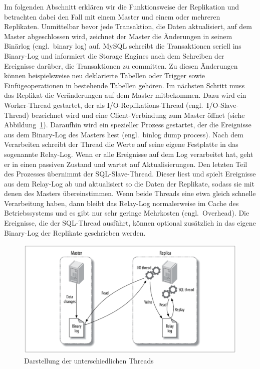 Im folgenden Abschnitt erklären wir die Funktionsweise der Replikation und betrachten dabei den Fall mit einem Master und einem oder mehreren Replikaten.
Unmittelbar bevor jede Transaktion, die Daten aktualisiert, auf dem Master abgeschlossen wird, zeichnet der Master die Änderungen in seinem Binärlog (engl.\ binary log) auf.
MySQL schreibt die Transaktionen seriell ins Binary-Log und informiert die Storage Engines nach dem Schreiben der Ereignisse darüber, die Transaktionen zu committen.
Zu diesen Änderungen können beispielsweise neu deklarierte Tabellen oder Trigger sowie Einfügeoperationen in bestehende Tabellen gehören.
Im nächsten Schritt muss das Replikat die Veränderungen auf dem Master mitbekommen.
Dazu wird ein Worker-Thread gestartet, der als I/O-Replikations-Thread (engl.\ I/O-Slave-Thread) bezeichnet wird und eine Client-Verbindung zum Master öffnet (siehe Abbildung~\ref{fig:master-replica}).
Daraufhin wird ein spezieller Prozess gestartet, der die Ereignisse aus dem Binary-Log des Masters liest (engl.\ binlog dump process).
Nach dem Verarbeiten schreibt der Thread die Werte auf seine eigene Festplatte in das sogenannte Relay-Log.
Wenn er alle Ereignisse auf dem Log verarbeitet hat, geht er in einen passiven Zustand und wartet auf Aktualisierungen.
Den letzten Teil des Prozesses übernimmt der SQL-Slave-Thread.
Dieser liest und spielt Ereignisse aus dem Relay-Log ab und aktualisiert so die Daten der Replikate, sodass sie mit denen des Masters übereinstimmen.
Wenn beide Threads eine etwa gleich schnelle Verarbeitung haben, dann bleibt das Relay-Log normalerweise im Cache des Betriebssystems und es gibt nur sehr geringe Mehrkosten (engl.\ Overhead).
Die Ereignisse, die der SQL-Thread ausführt, können optional zusätzlich in das eigene Binary-Log der Replikate geschrieben werden.

\vspace{-5pt}
\begin{figure}[H]
  \centering
  \includegraphics[width=.8\textwidth]{PNGs/Textbook/Master_Replica}
  \caption[Master-Replikat-Visualisierung]{Darstellung der unterschiedlichen Threads}
  \label{fig:master-replica}
\end{figure}
\vspace{-18pt}

